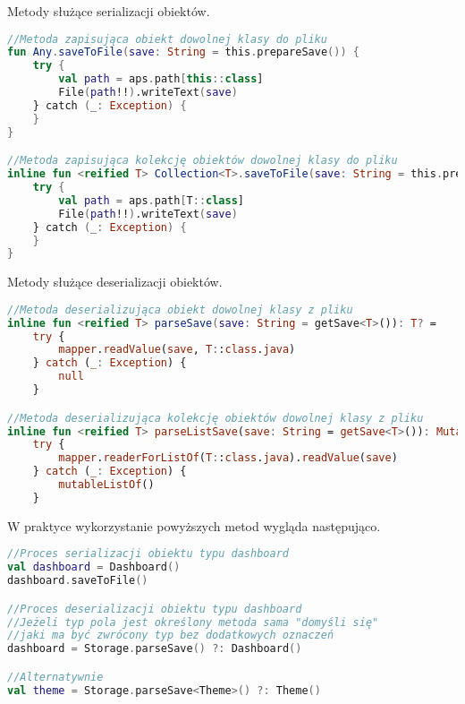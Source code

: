 \vspace{1em}

Metody służące serializacji obiektów.

\begin{lstlisting}[language=Kotlin]
//Metoda zapisująca obiekt dowolnej klasy do pliku
fun Any.saveToFile(save: String = this.prepareSave()) {
    try {
        val path = aps.path[this::class]
        File(path!!).writeText(save)
    } catch (_: Exception) {
    }
}

//Metoda zapisująca kolekcję obiektów dowolnej klasy do pliku
inline fun <reified T> Collection<T>.saveToFile(save: String = this.prepareSave()) {
    try {
        val path = aps.path[T::class]
        File(path!!).writeText(save)
    } catch (_: Exception) {
    }
}
\end{lstlisting}

\newpage

Metody służące deserializacji obiektów.

\begin{lstlisting}[language=Kotlin]
//Metoda deserializująca obiekt dowolnej klasy z pliku
inline fun <reified T> parseSave(save: String = getSave<T>()): T? =
    try {
        mapper.readValue(save, T::class.java)
    } catch (_: Exception) {
        null
    }

//Metoda deserializująca kolekcję obiektów dowolnej klasy z pliku
inline fun <reified T> parseListSave(save: String = getSave<T>()): MutableList<T> =
    try {
        mapper.readerForListOf(T::class.java).readValue(save)
    } catch (_: Exception) {
        mutableListOf()
    }
\end{lstlisting}

\vspace{1em}

W praktyce wykorzystanie powyższych metod wygląda następująco.

\begin{lstlisting}[language=Kotlin]
//Proces serializacji obiektu typu dashboard
val dashboard = Dashboard()
dashboard.saveToFile()

//Proces deserializacji obiektu typu dashboard
//Jeżeli typ pola jest określony metoda sama "domyśli się"
//jaki ma być zwrócony typ bez dodatkowych oznaczeń
dashboard = Storage.parseSave() ?: Dashboard()

//Alternatywnie
val theme = Storage.parseSave<Theme>() ?: Theme()
\end{lstlisting}

\newpage

